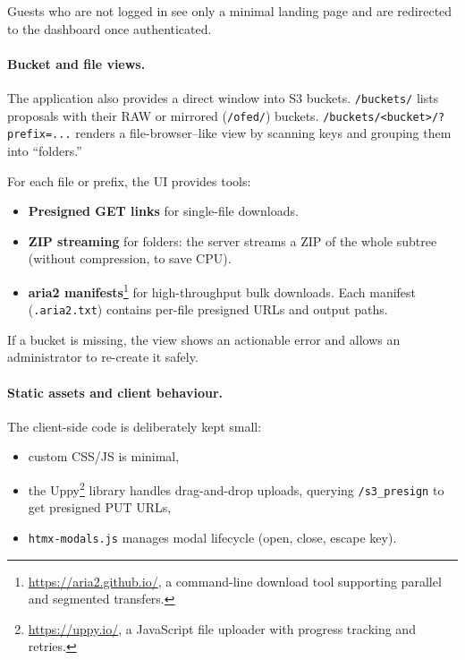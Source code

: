 Guests who are not logged in see only a minimal landing page and are redirected to the dashboard once authenticated.

\paragraph{Bucket and file views.}
The application also provides a direct window into S3 buckets.  
\texttt{/buckets/} lists proposals with their RAW or mirrored (\texttt{/ofed/}) buckets.  
\texttt{/buckets/<bucket>/?prefix=...} renders a file-browser–like view by scanning keys and grouping them into “folders.”  

For each file or prefix, the UI provides tools:  
\begin{itemize}
	\item \textbf{Presigned GET links} for single-file downloads.  
	\item \textbf{ZIP streaming} for folders: the server streams a ZIP of the whole subtree 
	(without compression, to save CPU).  
	\item \textbf{aria2 manifests}\footnote{\url{https://aria2.github.io/}, a command-line download tool supporting parallel and segmented transfers.} 
	for high-throughput bulk downloads. Each manifest (\texttt{.aria2.txt}) contains per-file presigned URLs and output paths.  
\end{itemize}

If a bucket is missing, the view shows an actionable error and allows an administrator to re-create it safely.

\paragraph{Static assets and client behaviour.}
The client-side code is deliberately kept small:  
\begin{itemize}
	\item custom CSS/JS is minimal,  
	\item the Uppy\footnote{\url{https://uppy.io/}, a JavaScript file uploader with progress tracking and retries.} library handles drag-and-drop uploads, 
	querying \texttt{/s3\_presign} to get presigned PUT URLs,  
	\item \texttt{htmx-modals.js} manages modal lifecycle (open, close, escape key).  
\end{itemize}

